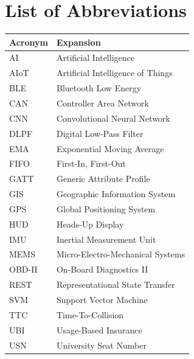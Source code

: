 \documentclass[12pt]{report}
\begin{document}
\chapter*{List of Abbreviations}
\begin{table}[H]
\centering
\begin{tabularx}{\textwidth}{lX}
\toprule
\textbf{Acronym} & \textbf{Expansion} \\
\midrule
AI & Artificial Intelligence \\
AIoT & Artificial Intelligence of Things \\
BLE & Bluetooth Low Energy \\
CAN & Controller Area Network \\
CNN & Convolutional Neural Network \\
DLPF & Digital Low-Pass Filter \\
EMA & Exponential Moving Average \\
FIFO & First-In, First-Out \\
GATT & Generic Attribute Profile \\
GIS & Geographic Information System \\
GPS & Global Positioning System \\
HUD & Heads-Up Display \\
IMU & Inertial Measurement Unit \\
MEMS & Micro-Electro-Mechanical Systems \\
OBD-II & On-Board Diagnostics II \\
REST & Representational State Transfer \\
SVM & Support Vector Machine \\
TTC & Time-To-Collision \\
UBI & Usage-Based Insurance \\
USN & University Seat Number \\
\bottomrule
\end{tabularx}
\end{table}

\newpage
{}
\setcounter{page}{1}

\pagestyle{fancy}

\end{document}
